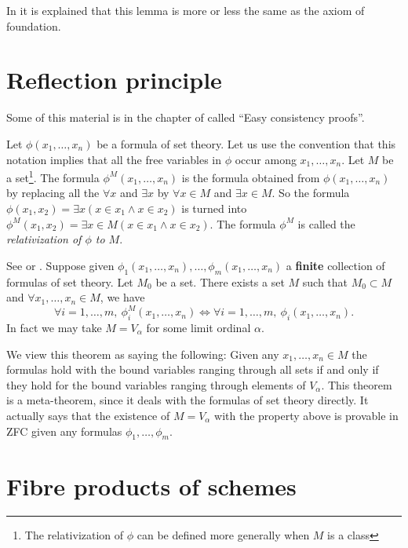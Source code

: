 \noindent
In \cite[Chapter III]{Kunen} it is explained that this lemma is
more or less the same as the axiom of foundation.

\section{Reflection principle}
\label{section-reflection-principle}

\noindent
Some of this material is in the chapter of \cite{Kunen} called
``Easy consistency proofs''.

\medskip\noindent
Let $\phi(x_1,\ldots,x_n)$ be a formula of set theory.
Let us use the convention that this notation implies that
all the free variables in $\phi$ occur among $x_1, \ldots, x_n$.
Let $M$ be a set\footnote{The relativization of $\phi$ can be defined
more generally when $M$ is a class}.
The formula $\phi^M(x_1, \ldots, x_n)$ is the
formula obtained from $\phi(x_1, \ldots, x_n)$ by replacing all the
$\forall x$ and $\exists x$ by $\forall x\in M$ and $\exists x\in M$.
So the formula
$\phi(x_1,x_2) = \exists x (x\in x_1 \wedge x\in x_2)$
is turned  into
$\phi^M(x_1,x_2) = \exists x \in M (x\in x_1 \wedge x\in x_2)$.
The formula $\phi^M$ is called the {\it relativization of $\phi$
to $M$}.

\begin{theorem}
\label{theorem-reflection-principle}
See \cite[Theorem 12.14]{Jech} or \cite[Theorem 7.4]{Kunen}.
Suppose given $\phi_1(x_1, \ldots, x_n), \ldots, \phi_m(x_1, \ldots, x_n)$
a {\bf finite} collection of
formulas of set theory. Let $M_0$ be a set.
There exists a set $M$ such that
$M_0 \subset M$ and
$\forall x_1, \ldots, x_n \in M$, we have
$$
\forall i = 1, \ldots, m,\  
\phi_i^{M}(x_1,\ldots,x_n)
\Leftrightarrow
\forall i = 1, \ldots, m,\  
\phi_i(x_1,\ldots,x_n).
$$
In fact we may take $M = V_\alpha$ for some limit ordinal $\alpha$.
\end{theorem}

\noindent
We view this theorem as saying the following: Given any
$x_1, \ldots, x_n \in M$ the formulas hold with the bound variables ranging
through all sets if and only if they hold for the bound variables ranging
through elements of $V_\alpha$. This theorem is a meta-theorem, since
it deals with the formulas of set theory directly.
It actually says that the existence of $M = V_\alpha$ with the property
above is provable in ZFC given any formulas $\phi_1, \ldots, \phi_m$.

\section{Fibre products of schemes}
\label{section-fibre-product-schemes}

